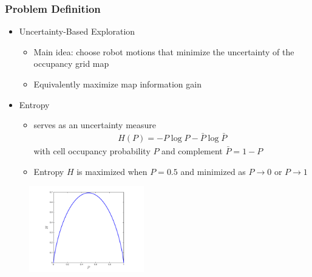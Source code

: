 \documentclass[11pt,professionalfonts,hyperref={pdftex,pdfpagemode=none,pdfstartview=FitH}]{beamer}
\renewcommand{\emph}[1]{\textit{\textbf{\color{blue}{#1}}}}
\begin{document}
\begin{frame}
\frametitle{Problem Definition}
\begin{itemize}
        	\item Uncertainty-Based Exploration
	\begin{itemize}
		\item Main idea: choose robot motions that minimize the uncertainty of the occupancy grid map
		\item Equivalently maximize map information gain
	\end{itemize}
\end{itemize}
\begin{minipage}[t]{7.0cm}
\begin{itemize}
	\item Entropy
	\begin{itemize}		
		\item \emph{Shannon's entropy} serves as an uncertainty measure
		\begin{align*}
			H(P)=-P\log P-\bar{P}\log \bar{P}%
		\end{align*}
		with cell occupancy probability $P$ and complement $\bar{P}=1-P$
		\item Entropy $H$ is maximized when $P=0.5$ and minimized as $P\rightarrow0$ or $P\rightarrow1$
	\end{itemize}
\end{itemize}
\end{minipage}
\begin{minipage}[t]{3.0cm}
\vspace*{0.5cm}
\begin{figure}[!htbp]
	\centerline{
		\hspace*{1.25cm}
   		\includegraphics[width=5.0cm]{H_Plotted_square.pdf}%
	}
\end{figure}
\end{minipage}

\end{frame}
\end{document}
